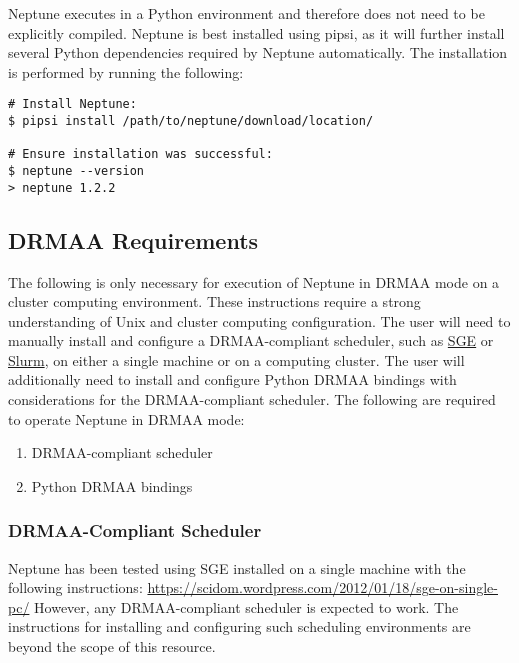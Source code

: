 \documentclass[a4paper,10pt]{article}
\begin{document}
Neptune executes in a Python environment and therefore does not need to be explicitly compiled. Neptune is best installed using pipsi, as it will further install several Python dependencies required by Neptune automatically. The installation is performed by running the following:

\begin{lstlisting}
# Install Neptune:
$ pipsi install /path/to/neptune/download/location/

# Ensure installation was successful:
$ neptune --version
> neptune 1.2.2
\end{lstlisting}

\newpage
\subsection{DRMAA Requirements}

The following is only necessary for execution of Neptune in DRMAA mode on a cluster computing environment. These instructions require a strong understanding of Unix and cluster computing configuration. The user will need to manually install and configure a DRMAA-compliant scheduler, such as \href{http://gridscheduler.sourceforge.net/}{SGE} or \href{http://slurm.schedmd.com/}{Slurm}, on either a single machine or on a computing cluster. The user will additionally need to install and configure Python DRMAA bindings with considerations for the DRMAA-compliant scheduler. The following are required to operate Neptune in DRMAA mode:

\begin{enumerate}
  \item DRMAA-compliant scheduler
  \item Python DRMAA bindings
\end{enumerate}

\subsubsection{DRMAA-Compliant Scheduler}

Neptune has been tested using SGE installed on a single machine with the following instructions:
\newline\newline
\url{https://scidom.wordpress.com/2012/01/18/sge-on-single-pc/}
\newline\newline
However, any DRMAA-compliant scheduler is expected to work. The instructions for installing and configuring such scheduling environments are beyond the scope of this resource.
\end{document}
